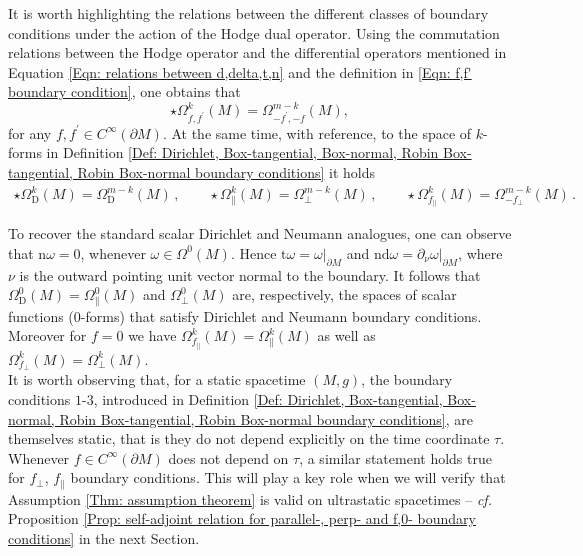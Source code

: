 \begin{remark}\label{Rmk: duality of bc under Hodge action}
	It is worth highlighting the relations between the different classes of boundary conditions under the action of the Hodge dual operator. Using the commutation relations between the Hodge operator and the differential operators mentioned in Equation \eqref{Eqn: relations between d,delta,t,n} and the definition in \eqref{Eqn: f,f' boundary condition}, one obtains that 
	\[	\star\Omega^k_{f,f^\prime}(M)=\Omega^{m-k}_{-f^\prime,-f}(M),		\]
	for any $f,f^\prime\in C^\infty(\partial M)$.
	At the same time, with reference, to the space of $k$-forms in Definition \ref{Def: Dirichlet, Box-tangential, Box-normal, Robin Box-tangential, Robin Box-normal boundary conditions} it holds
	\begin{align}\label{Eqn: duality between Dirichlet-Neumann boundary conditions}
	\star\Omega^k_{\mathrm{D}}(M)=\Omega^{m-k}_{\mathrm{D}}(M)\,,\qquad
	\star\Omega^k_\parallel(M)=\Omega^{m-k}_\perp(M)\,,\qquad
	\star\Omega^k_{f_\parallel}(M)=\Omega^{m-k}_{-f_\perp}(M)\,.
	\end{align}
\end{remark}


To recover the standard scalar Dirichlet and Neumann analogues, one can observe that $\mathrm{n}\omega=0$, whenever $\omega\in\Omega^0(M)$. Hence $\mathrm{t}\omega=\omega|_{\partial M}$ and $\mathrm{n}\mathrm{d}\omega=\partial_\nu \omega|_{\partial M}$, where $\nu$ is the outward pointing unit vector normal to the boundary. It follows that $\Omega^0_{\mathrm{D}}(M)=\Omega^0_\parallel(M)$ and $\Omega^0_{\perp}(M)$ are, respectively, the spaces of scalar functions ($0$-forms) that satisfy Dirichlet and Neumann boundary conditions.
Moreover for $f=0$ we have $\Omega^k_{f_\parallel}(M)=\Omega^k_{\parallel}(M)$ as well as $\Omega^k_{f_\perp}(M)=\Omega^k_\perp(M)$.
\\
It is worth observing that, for a static spacetime $(M,g)$, the boundary conditions $1$-$3$, introduced in Definition \ref{Def: Dirichlet, Box-tangential, Box-normal, Robin Box-tangential, Robin Box-normal boundary conditions}, are themselves static, that is they do not depend explicitly on the time coordinate $\tau$.
Whenever $f\in C^\infty(\partial M)$ does not depend on $\tau$, a similar statement holds true for $f_\perp$, $f_\parallel$ boundary conditions.
This will play a key role when we will verify that Assumption \ref{Thm: assumption theorem} is valid on ultrastatic spacetimes -- \textit{cf.} Proposition \ref{Prop: self-adjoint relation for parallel-, perp- and f,0- boundary conditions} in the next Section.



